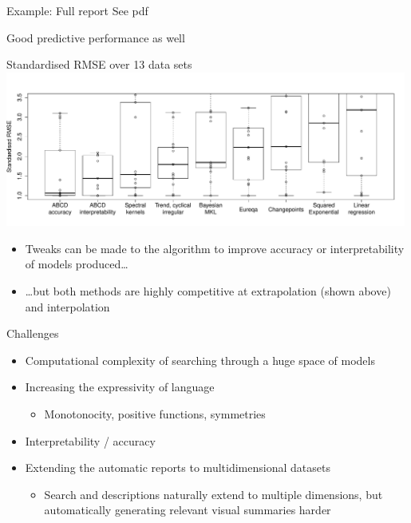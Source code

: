 \begin{frame}{Example: Full report}
  See pdf
\end{frame}

\begin{frame}{Good predictive performance as well}
  \begin{block}{Standardised RMSE over 13 data sets}
  \includegraphics[width=0.99\textwidth]{figures/box_extrap_wide}\\
  \begin{itemize}
    \item Tweaks can be made to the algorithm to improve accuracy or interpretability of models produced\ldots
    \vspace{\baselineskip}
    \item \ldots but both methods are highly competitive at extrapolation (shown above) and interpolation
  \end{itemize}
  \end{block}
\end{frame}

\begin{frame}{Challenges}
  \begin{itemize}
    \item Computational complexity of searching through a huge space of models
    \vspace{\baselineskip}
    \item Increasing the expressivity of language
    \begin{itemize}
      \item \eg Monotonocity, positive functions, symmetries
    \end{itemize}
    \vspace{\baselineskip}
    \item Interpretability / accuracy
    \vspace{\baselineskip}
    \item Extending the automatic reports to multidimensional datasets
    \begin{itemize}
      \item Search and descriptions naturally extend to multiple dimensions, but automatically generating relevant visual summaries harder 
    \end{itemize}
  \end{itemize}
\end{frame}

